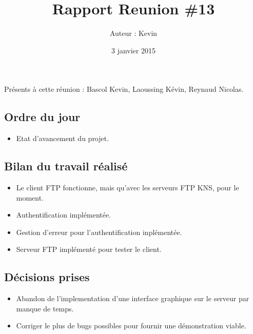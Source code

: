 \documentclass[12pt,a4paper]{article}
\title{Rapport Reunion \#13}
\author{Auteur : Kevin \bsc{BASCOL}}
\date{3 janvier 2015}
\begin{document}
\maketitle

\newpage

Présents à cette réunion : Bascol Kevin, Laoussing Kévin, Reynaud Nicolas.

\subsection*{Ordre du jour}
\begin{itemize}[label = $\blacktriangleright$]
\item Etat d'avancement du projet.
\end{itemize}

\subsection*{Bilan du travail réalisé}

\begin{itemize}[label = $\blacktriangleright$]
\item Le client FTP fonctionne, mais qu'avec les serveurs FTP KNS, pour le moment.

\item Authentification implémentée. 

\item Gestion d'erreur pour l'authentification inplémentée.

\item Serveur FTP implémenté pour tester le client.
\end{itemize}


\subsection*{Décisions prises}

\begin{itemize}[label = $\blacktriangleright$] 
\item Abandon de l'implementation d'une interface graphique sur le serveur par manque de temps.

\item Corriger le plus de bugs possibles pour fournir une démonstration viable.
\end{itemize}
\end{document}
